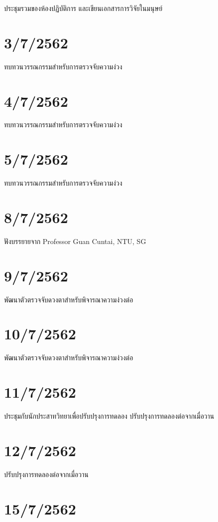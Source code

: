 ประชุมรวมของห้องปฏิบัติการ และเขียนเอกสารการวิจัยในมนุษย์

\section*{3/7/2562}

ทบทวนวรรณกรรมสำหรับการตรวจจับความง่วง

\section*{4/7/2562}

ทบทวนวรรณกรรมสำหรับการตรวจจับความง่วง

\section*{5/7/2562}

ทบทวนวรรณกรรมสำหรับการตรวจจับความง่วง

\section*{8/7/2562}

ฟังบรรยายจาก Professor Guan Cuntai, NTU, SG

\section*{9/7/2562}

พัฒนาตัวตรวจจับดวงตาสำหรับพิจารณาความง่วงต่อ

\section*{10/7/2562}

พัฒนาตัวตรวจจับดวงตาสำหรับพิจารณาความง่วงต่อ

\section*{11/7/2562}

ประชุมกับนักประสาทวิทยาเพื่อปรับปรุงการทดลอง ปรับปรุงการทดลองต่อจากเมื่อวาน

\section*{12/7/2562}

ปรับปรุงการทดลองต่อจากเมื่อวาน

\section*{15/7/2562}

